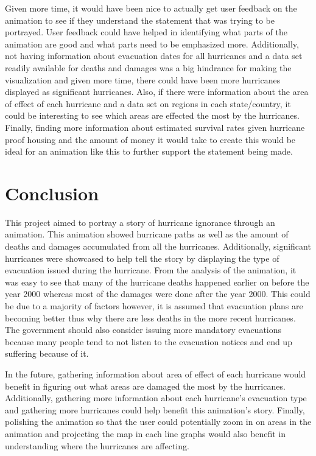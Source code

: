 Given more time, it would have been nice to actually get user feedback on the animation to see if they understand the statement that was trying to be portrayed. User feedback could have helped in identifying what parts of the animation are good and what parts need to be emphasized more. Additionally, not having information about evacuation dates for all hurricanes and a data set readily available for deaths and damages was a big hindrance for making the visualization and given more time, there could have been more hurricanes displayed as significant hurricanes. Also, if there were information about the area of effect of each hurricane and a data set on regions in each state/country, it could be interesting to see which areas are effected the most by the hurricanes. Finally, finding more information about estimated survival rates given hurricane proof housing and the amount of money it would take to create this would be ideal for an animation like this to further support the statement being made. 

\section{Conclusion}
\label{sec:conclusion}

This project aimed to portray a story of hurricane ignorance through an animation. This animation showed hurricane paths as well as the amount of deaths and damages accumulated from all the hurricanes. Additionally, significant hurricanes were showcased to help tell the story by displaying the type of evacuation issued during the hurricane. From the analysis of the animation, it was easy to see that many of the hurricane deaths happened earlier on before the year 2000 whereas most of the damages were done after the year 2000. This could be due to a majority of factors however, it is assumed that evacuation plans are becoming better thus why there are less deaths in the more recent hurricanes. The government should also consider issuing more mandatory evacuations because many people tend to not listen to the evacuation notices and end up suffering because of it.

In the future, gathering information about area of effect of each hurricane would benefit in figuring out what areas are damaged the most by the hurricanes. Additionally, gathering more information about each hurricane's evacuation type and gathering more hurricanes could help benefit this animation's story. Finally, polishing the animation so that the user could potentially zoom in on areas in the animation and projecting the map in each line graphs would also benefit in understanding where the hurricanes are affecting.